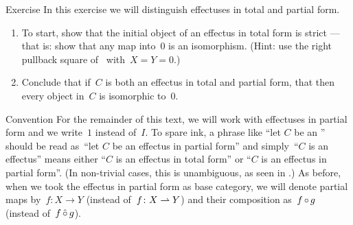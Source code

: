 \documentclass[b]{subfiles}
\begin{document}
\begin{parsec}%
\begin{point}{Exercise}%
In this exercise we will
    distinguish effectuses in total and partial form.
\begin{enumerate}
\item
To start, show that the initial object of an effectus in total form is strict
    --- that is: show that any map into~$0$ is an isomorphism.
    (Hint: use the right pullback square of~
        with~$X=Y=0$.)
\item
Conclude that if~$C$ is both an effectus in total and partial form,
that then every object in~$C$ is isomorphic to~$0$.
\end{enumerate}
\end{point}
\begin{point}{Convention}%
For the remainder of this text, we will work with effectuses in partial form
    and we write~$1$ instead of~$I$.
To spare ink, a phrase like ``let $C$ be an ''
should be read as~``let $C$ be an effectus in partial form''
and simply~``$C$ is an effectus'' means either ``$C$ is an effectus in total form''
    or ``$C$ is an effectus in partial form''.
(In non-trivial cases, this
    is unambiguous, as seen in .)
As before, when we took the effectus in partial form as base category,
    we will denote partial maps by~$f\colon X \to Y$
    (instead of~$f\colon X \rightharpoonup Y$)
        and their composition as~$f \mathop{\circ} g$
        (instead of~$f \mathop{\hat\circ} g$).
\end{point}
\end{parsec}
\end{document}

